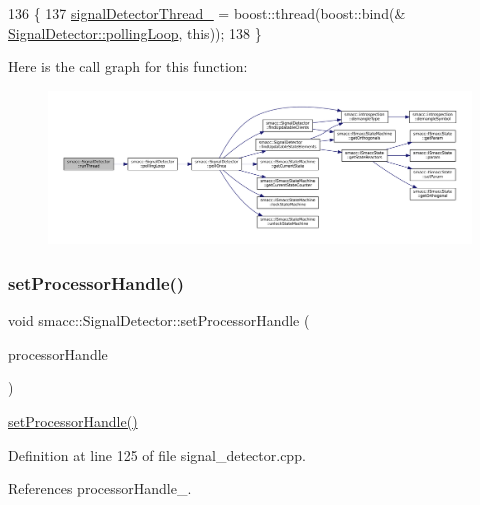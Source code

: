 \begin{DoxyCode}
136     \{
137         \hyperlink{classsmacc_1_1SignalDetector_a4346a400cd37eafc5d1d2e63d975785e}{signalDetectorThread\_} = boost::thread(boost::bind(&
      \hyperlink{classsmacc_1_1SignalDetector_a2665e66cdae9f6533c64bbcecf3fa199}{SignalDetector::pollingLoop}, \textcolor{keyword}{this}));
138     \}
\end{DoxyCode}
Here is the call graph for this function\+:
\nopagebreak
\begin{figure}[H]
\begin{center}
\leavevmode
\includegraphics[width=350pt]{classsmacc_1_1SignalDetector_a48b3fee853ddcb25732408b22ecfcf39_cgraph}
\end{center}
\end{figure}
\mbox{\label{classsmacc_1_1SignalDetector_ac1197a77c32a3b817005391e550ce646}} 
\subsubsection{\texorpdfstring{set\+Processor\+Handle()}{setProcessorHandle()}}
{\footnotesize\ttfamily void smacc\+::\+Signal\+Detector\+::set\+Processor\+Handle (\begin{DoxyParamCaption}\item[{Smacc\+Fifo\+Scheduler\+::processor\+\_\+handle}]{processor\+Handle }\end{DoxyParamCaption})}

\hyperlink{classsmacc_1_1SignalDetector_ac1197a77c32a3b817005391e550ce646}{set\+Processor\+Handle()} 

Definition at line 125 of file signal\+\_\+detector.\+cpp.



References processor\+Handle\+\_\+.



